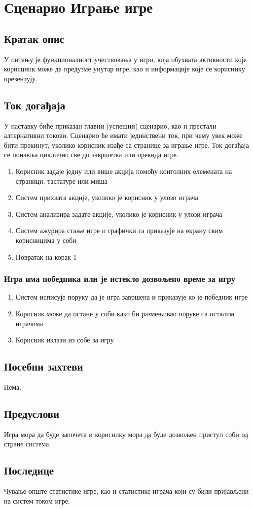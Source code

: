 \section{Сценарио Играње игре}

\subsection{Кратак опис}
У питању је функционалност учествовања у игри, која обухвата активности које корисцник може да предузме унутар игре, као и информације које се кориснику презентују.

\subsection{Ток догађаја}
У наставку биће приказан главни (успешни) сценарио, као и престали алтернативни токови. Сценарио ће имати јединствени ток, при чему увек може бити прекинут, уколико корисник изађе са странице за играње игре. Ток догађаја се понавља циклично све до завршетка или прекида игре.

\begin{enumerate}
    \item Корисник задаје једну или више акција помоћу контолних елемената на страници,
          тастатуре или миша
    \item Систем прихвата акције, уколико је корисник у улози играча
    \item Систем анализира задате акције, уколико је корисник у улози играча
    \item Систем ажурира стање игре и графички га приказује на екрану свим корисницима
          у соби
    \item Повратак на корак 1
\end{enumerate}


\subsubsection{Игра има победника или је истекло дозвољено време за игру}
\begin{enumerate}[label=5.\arabic*]
	\item Систем исписује поруку да је игра завршена и приказује ко је победник игре
	\item Корисник може да остане у соби како би размењивао поруке са осталим
	      играчима
	\item Корисник излази из собе за игру
\end{enumerate}

\subsection{Посебни захтеви}
Нема.

\subsection{Предуслови}
Игра мора да буде започета и кориснику мора да буде дозвољен приступ соби од стране система.

\subsection{Последице}
Чување опште статистике игре, као и статистике играча који су били пријављени на систем током игре.
